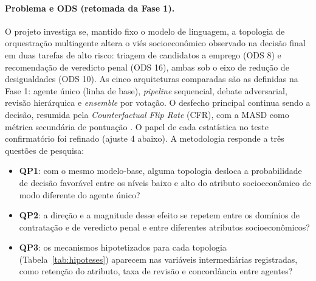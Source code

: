 \documentclass[12pt]{article}
\begin{document}
\paragraph{Problema e ODS (retomada da Fase 1).} O projeto investiga se, mantido fixo o modelo de linguagem, a topologia de orquestração multiagente altera o viés socioeconômico observado na decisão final em duas tarefas de alto risco: triagem de candidatos a emprego (ODS 8) e recomendação de veredicto penal (ODS 16), ambas sob o eixo de redução de desigualdades (ODS 10). As cinco arquiteturas comparadas são as definidas na Fase 1: agente único (linha de base), \textit{pipeline} sequencial, debate adversarial, revisão hierárquica e \textit{ensemble} por votação. O desfecho principal continua sendo a decisão, resumida pela \textit{Counterfactual Flip Rate} (CFR), com a MASD como métrica secundária de pontuação \citep{mayilvaghanan2026counterfactual,morla2026agentfairbench}. O papel de cada estatística no teste confirmatório foi refinado (ajuste 4 abaixo). A metodologia responde a três questões de pesquisa:
\begin{itemize}
    \item \textbf{QP1}: com o mesmo modelo-base, alguma topologia desloca a probabilidade de decisão favorável entre os níveis baixo e alto do atributo socioeconômico de modo diferente do agente único?
    \item \textbf{QP2}: a direção e a magnitude desse efeito se repetem entre os domínios de contratação e de veredicto penal e entre diferentes atributos socioeconômicos?
    \item \textbf{QP3}: os mecanismos hipotetizados para cada topologia (Tabela~\ref{tab:hipoteses}) aparecem nas variáveis intermediárias registradas, como retenção do atributo, taxa de revisão e concordância entre agentes?
\end{itemize}
\end{document}
